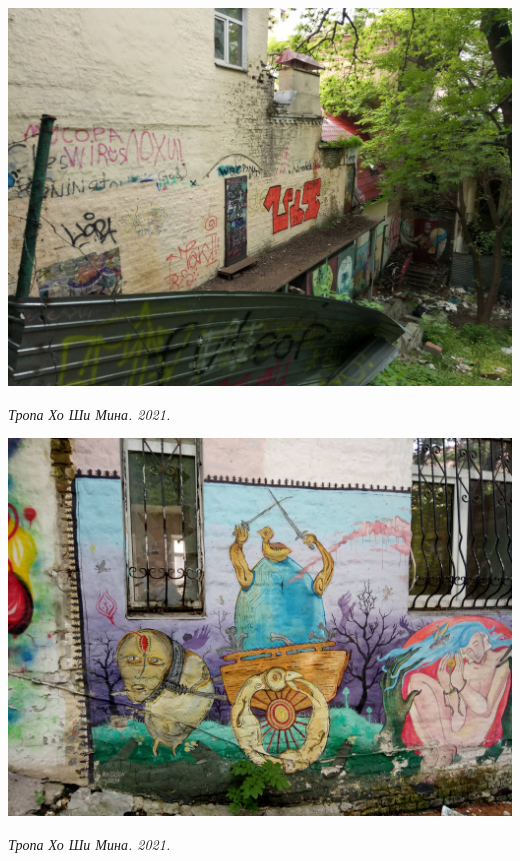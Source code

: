 \begin{center}
\includegraphics[width=\linewidth]{rpix/IMG_20210601_134945.jpg}

\textit{Тропа Хо Ши Мина. 2021.}
\end{center}

\begin{center}
\includegraphics[width=\linewidth]{rpix/IMG_20210601_135238.jpg}

\textit{Тропа Хо Ши Мина. 2021.}
\end{center}

\newpage

\vspace*{\fill}

